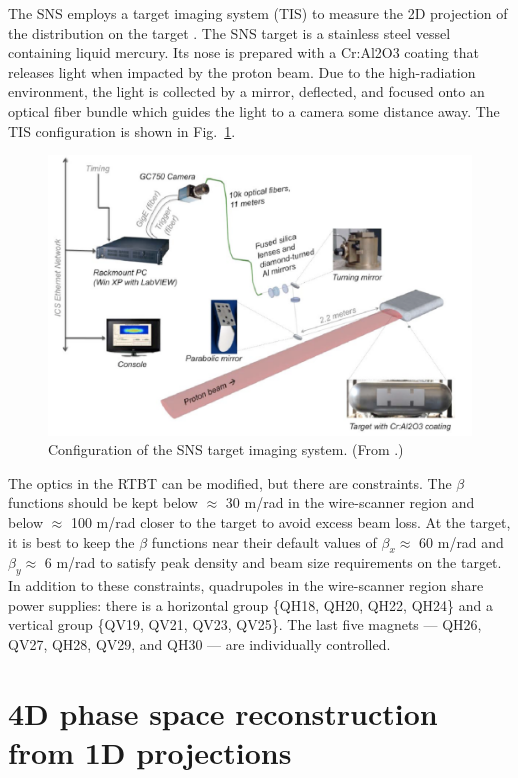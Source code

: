 The SNS employs a target imaging system (TIS) to measure the 2D projection of the distribution on the target \cite{Blokland2010}. The SNS target is a stainless steel vessel containing liquid mercury. Its nose is prepared with a Cr:Al2O3 coating that releases light when impacted by the proton beam. Due to the high-radiation environment, the light is collected by a mirror, deflected, and focused onto an optical fiber bundle which guides the light to a camera some distance away. The TIS configuration is shown in Fig.~\ref{fig:tis}.
%
\begin{figure}[!p]
    \centering
    \includegraphics[width=\textwidth]{Images/chapter4/tis1.png}
    \caption{Configuration of the SNS target imaging system. (From \cite{Blokland2010}.)}
    \label{fig:tis}
\end{figure}
%

The optics in the RTBT can be modified, but there are constraints. The $\beta$ functions should be kept below $\approx$ 30 m/rad in the wire-scanner region and below $\approx$ 100 m/rad closer to the target to avoid excess beam loss. At the target, it is best to keep the $\beta$ functions near their default values of $\beta_x \approx$ 60 m/rad and $\beta_y \approx$ 6 m/rad to satisfy peak density and beam size requirements on the target. In addition to these constraints, quadrupoles in the wire-scanner region share power supplies: there is a horizontal group \{QH18, QH20, QH22, QH24\} and a vertical group \{QV19, QV21, QV23, QV25\}. The last five magnets — QH26, QV27, QH28, QV29, and QH30 — are individually controlled.


\section{4D phase space reconstruction from 1D projections}\label{sec:Phase space reconstruction from 1D projections}

